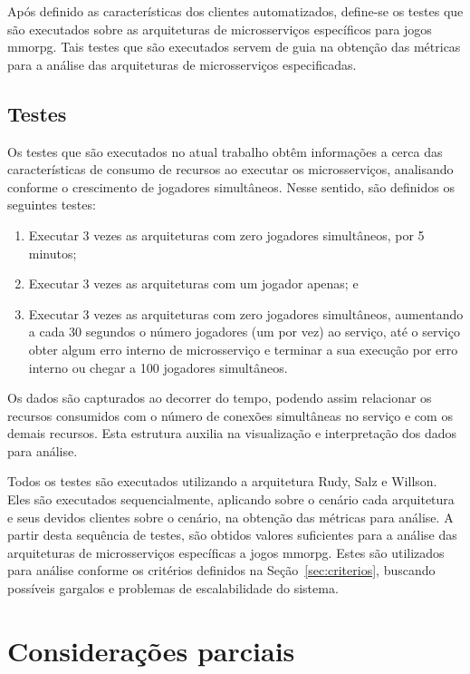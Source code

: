 Após definido as características dos clientes automatizados, define-se os testes que são executados sobre as arquiteturas de microsserviços específicos para jogos \ac{mmorpg}.
%
Tais testes que são executados servem de guia na obtenção das métricas para a análise das arquiteturas de microsserviços especificadas.

\subsection{Testes}
\label{sec:cap4_testes}

Os testes que são executados no atual trabalho obtêm informações a cerca das características de consumo de recursos ao  executar os microsserviços, analisando conforme o crescimento de jogadores simultâneos.
%
Nesse sentido, são definidos os seguintes testes:

\begin{enumerate}
  \item Executar 3 vezes as arquiteturas com zero jogadores simultâneos, por 5 minutos;
  \item Executar 3 vezes as arquiteturas com um jogador apenas; e
  \item Executar 3 vezes as arquiteturas com zero jogadores simultâneos, aumentando a cada 30 segundos o número jogadores (um por vez) ao serviço, até o serviço obter algum erro interno de microsserviço e terminar a sua execução por erro interno ou chegar a 100 jogadores simultâneos.
\end{enumerate}

Os dados são capturados ao decorrer do tempo, podendo assim relacionar os recursos consumidos com o número de conexões simultâneas no serviço e com os demais recursos.
%
Esta estrutura auxilia na visualização e interpretação dos dados para análise.

Todos os testes são executados utilizando a arquitetura Rudy, Salz e Willson.
%
Eles são executados sequencialmente, aplicando sobre o cenário cada arquitetura e seus devidos clientes sobre o cenário, na obtenção das métricas para análise.
%
A partir desta sequência de testes, são obtidos valores suficientes para a análise das arquiteturas de microsserviços específicas a jogos \ac{mmorpg}.
%
Estes são utilizados para análise conforme os critérios definidos na Seção~\ref{sec:criterios}, buscando possíveis gargalos e problemas de escalabilidade do sistema.


\section{Considerações parciais}


